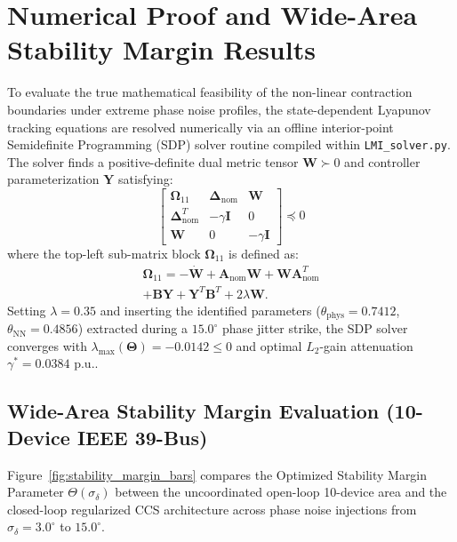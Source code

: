 \documentclass[journal]{IEEEtran}
\begin{document}
\section{Numerical Proof and Wide-Area Stability Margin Results}
To evaluate the true mathematical feasibility of the non-linear contraction boundaries under extreme phase noise profiles, the state-dependent Lyapunov tracking equations are resolved numerically via an offline interior-point Semidefinite Programming (SDP) solver routine compiled within \texttt{LMI\_solver.py}. The solver finds a positive-definite dual metric tensor $\bm{W} \succ 0$ and controller parameterization $\bm{Y}$ satisfying:
\begin{equation}
    \begin{bmatrix}
        \bm{\Omega}_{11} & \bm{\Delta}_{\text{nom}} & \bm{W} \\
        \bm{\Delta}_{\text{nom}}^T & -\gamma \bm{I} & 0 \\
        \bm{W} & 0 & -\gamma \bm{I}
    \end{bmatrix} \preceq 0
\end{equation}
where the top-left sub-matrix block $\bm{\Omega}_{11}$ is defined as:
\begin{multline}
    \bm{\Omega}_{11} = -\dot{\bm{W}} + \bm{A}_{\text{nom}}\bm{W} + \bm{W}\bm{A}_{\text{nom}}^T \\
    + \bm{B}\bm{Y} + \bm{Y}^T\bm{B}^T + 2\lambda\bm{W}.
\end{multline}
Setting $\lambda = 0.35$ and inserting the identified parameters ($\theta_{\text{phys}} = 0.7412$, $\theta_{\text{NN}} = 0.4856$) extracted during a $15.0^\circ$ phase jitter strike, the SDP solver converges with $\lambda_{\max}(\bm{\Theta}) = -0.0142 \le 0$ and optimal $L_2$-gain attenuation $\gamma^* = 0.0384\text{ p.u.}$.

\subsection{Wide-Area Stability Margin Evaluation (10-Device IEEE 39-Bus)}
Figure~\ref{fig:stability_margin_bars} compares the Optimized Stability Margin Parameter $\Theta(\sigma_{\delta})$ between the uncoordinated open-loop 10-device area and the closed-loop regularized CCS architecture across phase noise injections from $\sigma_{\delta} = 3.0^\circ$ to $15.0^\circ$.
\end{document}
